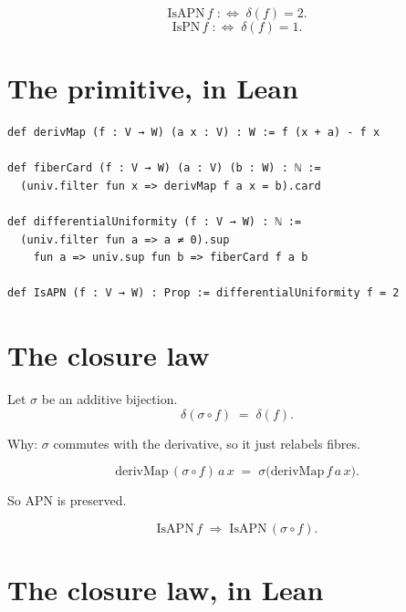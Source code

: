 \documentclass[11pt]{article}
\begin{document}
\[
  \mathrm{IsAPN}\, f \;:\Longleftrightarrow\; \delta(f) = 2.
\]
\[
  \mathrm{IsPN}\, f \;:\Longleftrightarrow\; \delta(f) = 1.
\]

\newpage


\section{The primitive, in Lean}

\bigskip

\begin{lstlisting}
def derivMap (f : V → W) (a x : V) : W := f (x + a) - f x

def fiberCard (f : V → W) (a : V) (b : W) : ℕ :=
  (univ.filter fun x => derivMap f a x = b).card

def differentialUniformity (f : V → W) : ℕ :=
  (univ.filter fun a => a ≠ 0).sup
    fun a => univ.sup fun b => fiberCard f a b

def IsAPN (f : V → W) : Prop := differentialUniformity f = 2
\end{lstlisting}

\bigskip


\newpage


\section{The closure law}

\bigskip

\begin{theorem}
Let $\sigma$ be an additive bijection.
\[
  \delta(\sigma \circ f) \;=\; \delta(f).
\]
\end{theorem}

\bigskip

Why: $\sigma$ commutes with the derivative, so it just relabels fibres.

\[
  \mathrm{derivMap}\,(\sigma \circ f)\, a\, x \;=\; \sigma\big(\mathrm{derivMap}\, f\, a\, x\big).
\]

\bigskip

So APN is preserved.

\[
  \mathrm{IsAPN}\, f \;\Longrightarrow\; \mathrm{IsAPN}\,(\sigma \circ f).
\]

\newpage


\section{The closure law, in Lean}
\end{document}
